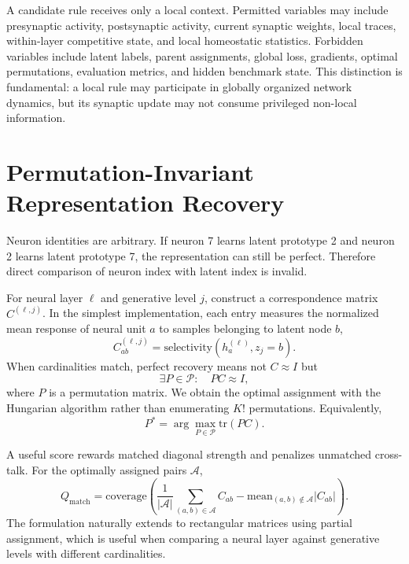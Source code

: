 \documentclass[11pt]{article}
\begin{document}
A candidate rule receives only a local context. Permitted variables may include presynaptic activity, postsynaptic activity, current synaptic weights, local traces, within-layer competitive state, and local homeostatic statistics. Forbidden variables include latent labels, parent assignments, global loss, gradients, optimal permutations, evaluation metrics, and hidden benchmark state. This distinction is fundamental: a local rule may participate in globally organized network dynamics, but its synaptic update may not consume privileged non-local information.

\section{Permutation-Invariant Representation Recovery}
Neuron identities are arbitrary. If neuron 7 learns latent prototype 2 and neuron 2 learns latent prototype 7, the representation can still be perfect. Therefore direct comparison of neuron index with latent index is invalid.

For neural layer $\ell$ and generative level $j$, construct a correspondence matrix $C^{(\ell,j)}$. In the simplest implementation, each entry measures the normalized mean response of neural unit $a$ to samples belonging to latent node $b$,
\begin{equation}
C_{ab}^{(\ell,j)} = \mathrm{selectivity}\left(h^{(\ell)}_a,z_j=b\right).
\end{equation}
When cardinalities match, perfect recovery means not $C\approx I$ but
\begin{equation}
\exists P\in\mathcal{P}:\quad PC\approx I,
\end{equation}
where $P$ is a permutation matrix. We obtain the optimal assignment with the Hungarian algorithm rather than enumerating $K!$ permutations. Equivalently,
\begin{equation}
P^* = \arg\max_{P\in\mathcal{P}} \mathrm{tr}(PC).
\end{equation}

A useful score rewards matched diagonal strength and penalizes unmatched cross-talk. For the optimally assigned pairs $\mathcal{A}$,
\begin{equation}
Q_{\mathrm{match}} = \mathrm{coverage}\left(\frac{1}{|\mathcal{A}|}\sum_{(a,b)\in\mathcal{A}}C_{ab} - \mathrm{mean}_{(a,b)\notin\mathcal{A}}|C_{ab}|\right).
\end{equation}
The formulation naturally extends to rectangular matrices using partial assignment, which is useful when comparing a neural layer against generative levels with different cardinalities.
\end{document}
